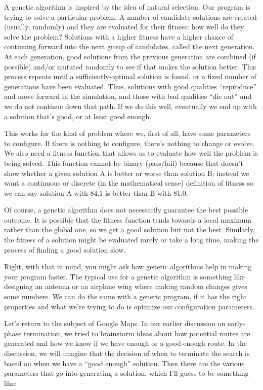 A genetic algorithm is inspired by the idea of natural selection. Our program is trying to solve a particular problem. A number of candidate solutions are created (usually, randomly) and they are evaluated for their fitness: how well do they solve the problem? Solutions with a higher fitness have a higher chance of continuing forward into the next group of candidates, called the next generation. At each generation, good solutions from the previous generation are combined (if possible) and/or mutated randomly to see if that makes the solution better. This process repeats until a sufficiently-optimal solution is found, or a fixed number of generations have been evaluated. Thus, solutions with good qualities ``reproduce'' and move forward in the simulation, and those with bad qualities ``die out'' and we do not continue down that path. If we do this well, eventually we end up with a solution that's good, or at least good enough.

This works for the kind of problem where we, first of all, have some parameters to configure. If there is nothing to configure, there's nothing to change or evolve. We also need a fitness function that allows us to evaluate how well the problem is being solved. This function cannot be binary (pass/fail) because that doesn't show whether a given solution A is better or worse than solution B; instead we want a continuous or discrete (in the mathematical sense) definition of fitness so we can say solution A with 84.1 is better than B with 81.0.

Of course, a genetic algorithm does not necessarily guarantee the best possible outcome. It is possible that the fitness function tends towards a local maximum rather than the global one, so we get a good solution but not the best. Similarly, the fitness of a solution might be evaluated rarely or take a long time, making the process of finding a good solution slow.

Right, with that in mind, you might ask how genetic algorithms help in making your program faster. The typical use for a genetic algorithm is something like designing an antenna or an airplane wing where making random changes gives some numbers. We can do the same with a generic program, if it has the right properties and what we're trying to do is optimize our configuration parameters.

Let's return to the subject of Google Maps. In our earlier discussion on early-phase termination, we tried to brainstorm ideas about how potential routes are generated and how we know if we have enough or a good-enough route. In the discussion, we will imagine that the decision of when to terminate the search is based on when we have a ``good enough'' solution. Then there are the various parameters that go into generating a solution, which I'll guess to be something like:

